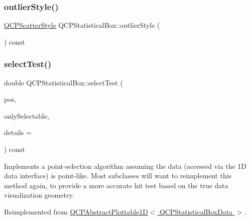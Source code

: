 \mbox{\label{class_q_c_p_statistical_box_aef92e38fcb8e5041a44c2e01886e3b66}} 
\subsubsection{\texorpdfstring{outlier\+Style()}{outlierStyle()}}
{\footnotesize\ttfamily \hyperlink{class_q_c_p_scatter_style}{Q\+C\+P\+Scatter\+Style} Q\+C\+P\+Statistical\+Box\+::outlier\+Style (\begin{DoxyParamCaption}{ }\end{DoxyParamCaption}) const\hspace{0.3cm}{\ttfamily [inline]}}

\mbox{\label{class_q_c_p_statistical_box_a1607fa92f829c631107c20ccb2d70a6d}} 
\subsubsection{\texorpdfstring{select\+Test()}{selectTest()}}
{\footnotesize\ttfamily double Q\+C\+P\+Statistical\+Box\+::select\+Test (\begin{DoxyParamCaption}\item[{const Q\+PointF \&}]{pos,  }\item[{bool}]{only\+Selectable,  }\item[{Q\+Variant $\ast$}]{details = {} }\end{DoxyParamCaption}) const\hspace{0.3cm}{\ttfamily [virtual]}}

Implements a point-\/selection algorithm assuming the data (accessed via the 1D data interface) is point-\/like. Most subclasses will want to reimplement this method again, to provide a more accurate hit test based on the true data visualization geometry.

Reimplemented from \hyperlink{class_q_c_p_abstract_plottable1_d_a4611b43bcb6441b2154eb4f4e0a33db2}{Q\+C\+P\+Abstract\+Plottable1\+D$<$ Q\+C\+P\+Statistical\+Box\+Data $>$}.

\mbox{\label{class_q_c_p_statistical_box_a42febad6ad5e924a151434cc434b4ffc}} 

